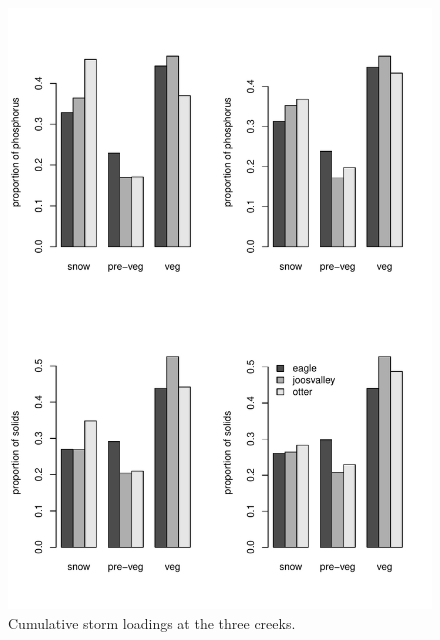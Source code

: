 \documentclass[12pt]{article}
\begin{document}
\begin{figure}[h!]
    \begin{center}
\includegraphics{loadings-fig2}
    \end{center}
    \vspace{-10mm}
    \caption{Cumulative storm loadings at the three creeks.\label{bars}}
\end{figure}
\end{document}
